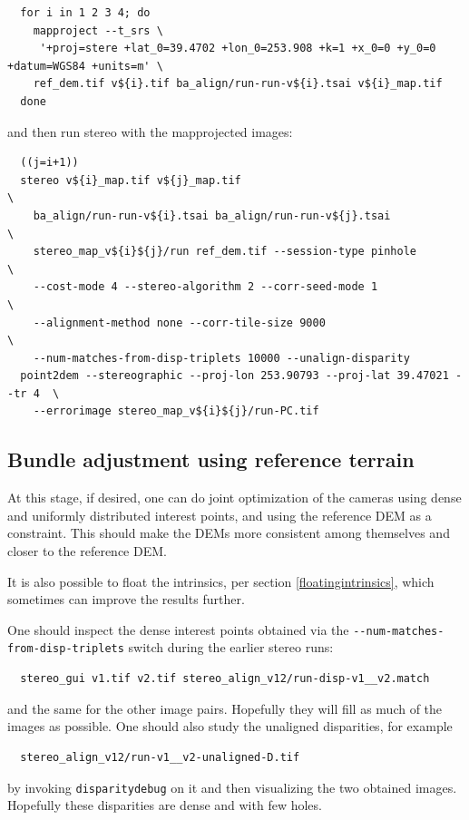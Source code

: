 \begin{verbatim}
  for i in 1 2 3 4; do 
    mapproject --t_srs \
     '+proj=stere +lat_0=39.4702 +lon_0=253.908 +k=1 +x_0=0 +y_0=0 +datum=WGS84 +units=m' \
    ref_dem.tif v${i}.tif ba_align/run-run-v${i}.tsai v${i}_map.tif  
  done
\end{verbatim} %

and then run stereo with the mapprojected images:

\begin{verbatim}
  ((j=i+1))
  stereo v${i}_map.tif v${j}_map.tif                                         \
    ba_align/run-run-v${i}.tsai ba_align/run-run-v${j}.tsai                  \
    stereo_map_v${i}${j}/run ref_dem.tif --session-type pinhole              \
    --cost-mode 4 --stereo-algorithm 2 --corr-seed-mode 1                    \
    --alignment-method none --corr-tile-size 9000                            \
    --num-matches-from-disp-triplets 10000 --unalign-disparity
  point2dem --stereographic --proj-lon 253.90793 --proj-lat 39.47021 --tr 4  \
    --errorimage stereo_map_v${i}${j}/run-PC.tif
\end{verbatim}

\subsection{Bundle adjustment using reference terrain}

At this stage, if desired, one can do joint optimization of the cameras using dense
and uniformly distributed interest points, and using the reference DEM as a constraint.
This should make the DEMs more consistent among themselves and closer to the reference DEM.

It is also possible to float the intrinsics, per section \ref{floatingintrinsics},
which sometimes can improve the results further. 

One should inspect the dense interest points obtained via the
\texttt{-\/-num-matches-from-disp-triplets} switch during the earlier stereo
runs:

\begin{verbatim}
  stereo_gui v1.tif v2.tif stereo_align_v12/run-disp-v1__v2.match
\end{verbatim}
and the same for the other image pairs. Hopefully they will fill as much
of the images as possible. One should also study the unaligned disparities,
for example
\begin{verbatim}
  stereo_align_v12/run-v1__v2-unaligned-D.tif
\end{verbatim}
by invoking \texttt{disparitydebug} on it and then visualizing the two
obtained images. Hopefully these disparities are dense and with few holes. 

